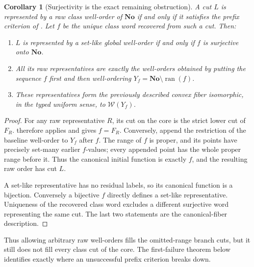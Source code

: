 \documentclass[11pt]{article}
\newtheorem{corollary}[corollary]{Corollary}
\theoremstyle{definition}
\theoremstyle{remark}
\newcommand{\No}{\mathbf{No}}
\newcommand{\WO}{\mathcal W}
\begin{document}
\begin{corollary}[Surjectivity is the exact remaining obstruction]
\label{swo:sh:cor:cut-representation-levels}
A cut $L$ is represented by a raw class well-order of
$\No$ if and only if it satisfies the prefix criterion
of .  Let $f$ be the unique
class word recovered from such a cut.  Then:
\begin{enumerate}
\item $L$ is represented by a set-like global well-order if and
only if $f$ is surjective onto $\No$.
\item All its raw representatives are exactly the well-orders
obtained by putting the sequence $f$ first and then well-ordering
$Y_f=\No\setminus\operatorname{ran}(f)$.
\item These representatives form the previously described convex
fiber isomorphic, in the typed uniform sense, to
$\WO(Y_f)$.
\end{enumerate}
\end{corollary}
\begin{proof}
For any raw representative $R$, its cut on the core is the strict
lower cut of $F_R$.   therefore
applies and gives $f=F_R$.  Conversely, append the restriction of the
baseline well-order to $Y_f$ after $f$.  The range
of $f$ is proper, and its points have precisely set-many earlier
$f$-values; every appended point has the whole proper range before
it.  Thus the canonical initial function is exactly $f$, and the
resulting raw order has cut $L$.

A set-like representative has no residual labels, so its canonical
function is a bijection.  Conversely a bijective $f$ directly defines
a set-like representative.  Uniqueness of the recovered class word
excludes a different surjective word representing the same cut.
The last two statements are the canonical-fiber description.
\end{proof}

Thus allowing arbitrary raw well-orders fills the omitted-range
branch cuts, but it still does not fill every class cut of the core.
The first-failure theorem below identifies exactly where an
unsuccessful prefix criterion breaks down.
\end{document}
